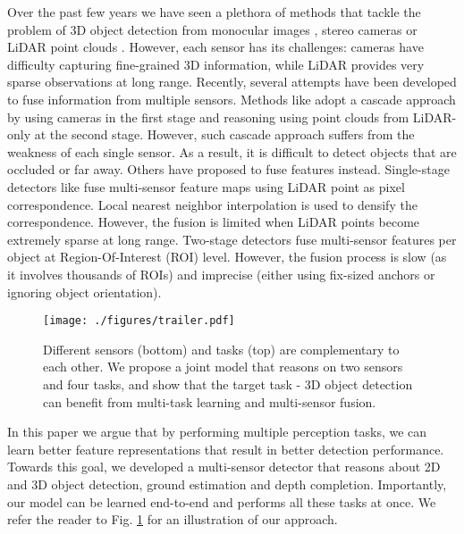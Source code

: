 \documentclass[10pt,twocolumn,letterpaper]{article}
\begin{document}
Over the past few years we have seen a plethora of methods that tackle the problem of 3D object detection from  monocular images \cite{mono3d, mono3d18}, stereo cameras \cite{3doppami} or LiDAR point clouds \cite{voxelnet, pixor, dpt}. 
However, each sensor has its challenges: cameras have difficulty capturing fine-grained 3D information, while LiDAR provides very sparse observations at long range.
Recently, several attempts \cite{mv3d, fpointnet, avod, contfuse} have been developed to fuse information from multiple sensors. 
Methods like \cite{fpointnet,fpccnn} adopt a cascade approach by using cameras in the first stage and reasoning using point clouds  from LiDAR-only at the second stage. However, such cascade approach  suffers from the weakness of each single sensor. As a result, it is difficult to detect objects that are occluded or far away. Others \cite{mv3d, avod, contfuse} have proposed to fuse features instead. 
Single-stage detectors like \cite{contfuse} fuse multi-sensor feature maps using LiDAR point as pixel correspondence. Local nearest neighbor interpolation is used to densify the correspondence. However, the fusion is limited when LiDAR points become extremely sparse at long range.
Two-stage detectors  \cite{mv3d, avod} fuse multi-sensor features per object at Region-Of-Interest (ROI) level. However, the fusion process is slow (as it involves thousands of ROIs) and imprecise (either using fix-sized anchors or ignoring object orientation).

\begin{figure}[!t]
\begin{center}
 \texttt{[image: ./figures/trailer.pdf]}
\end{center}
   \caption{Different sensors (bottom) and tasks (top) are complementary to each other. We propose a joint model that reasons on two sensors and four tasks, and show that the target task - 3D object detection can benefit from multi-task learning and multi-sensor fusion.}
\label{fig:trailer}
\end{figure}


In this paper we argue that by performing multiple perception tasks, we can learn better feature representations that result in better detection performance. 
Towards this goal, we developed a multi-sensor
detector that reasons about 2D and 3D object detection, ground estimation and depth completion. 
Importantly, our model can be learned end-to-end and performs all these tasks at once. 
We refer the reader to Fig. \ref{fig:trailer} for an illustration of our approach.
\end{document}
